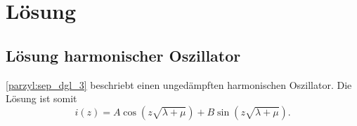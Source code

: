 %
%
%
\section{Lösung
\label{parzyl:section:teil1}}
\subsection{Lösung harmonischer Oszillator}
\eqref{parzyl:sep_dgl_3} beschriebt einen ungedämpften harmonischen Oszillator.
Die Lösung ist somit
\begin{equation}
	i(z) 
	= 
	A\cos{ 
		\left ( z
		\sqrt{\lambda + \mu}
		\right )}
	+
	B\sin{ 
		\left ( z
		\sqrt{\lambda + \mu}
		\right )}.
\end{equation}
